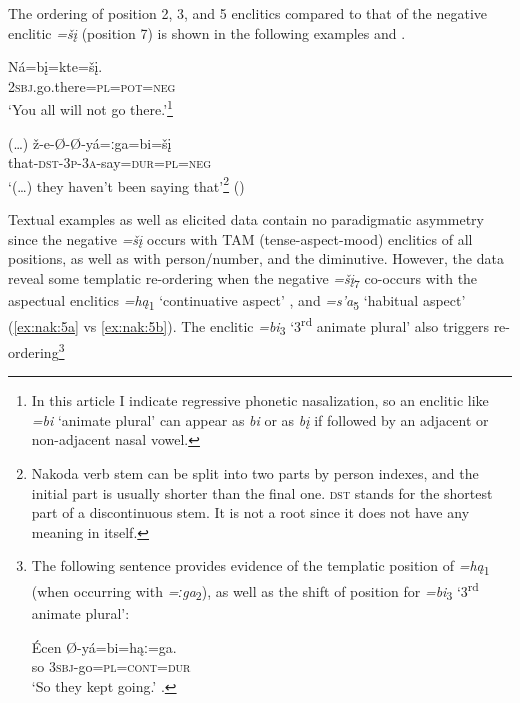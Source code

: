 \documentclass[output=paper,colorlinks,citecolor=brown]{langscibook}
\begin{document}
\newpage%
The ordering of position 2, 3, and 5 enclitics compared to that of the negative enclitic \textit{=šį} (position 7) is shown in the following examples  and .

\ea\label{ex:nak:2} 
    \gll Ná=bį=kte=šį. \\
        2\textsc{sbj}.go.there=\textsc{pl=pot=neg} \\ 
    \glt ‘You all will not go there.’\footnote{In this article I indicate regressive phonetic nasalization, so an enclitic like \textit{=bi} ‘animate plural’ can appear as \textit{bi} or as \textit{bį} if followed by an adjacent or non-adjacent nasal vowel.}
\z 

\ea\label{ex:nak:3}
    \gll (…) ž-e-Ø-Ø-yá=ːga=bi=šį \\
        {} that-\textsc{dst-3p-3a}-say=\textsc{dur=pl=neg} \\
    \glt ‘(…) they haven’t been saying that’\footnote{Nakoda verb stem can be split into two parts by person indexes, and the initial part is usually shorter than the final one. \textsc{dst} stands for the shortest part of a discontinuous stem. It is not a root since it does not have any meaning in itself.} (\citealt[33]{ParksDeMallie2012b})
\z 

Textual examples as well as elicited data contain no paradigmatic asymmetry since the negative \textit{=šį} occurs with TAM (tense-aspect-mood) enclitics of all positions, as well as with person/number, and the diminutive. However, the data reveal some templatic re-ordering when the negative \textit{=šį}\textsubscript{7} co-occurs with the aspectual enclitics \textit{=hą}\textsubscript{1} ‘continuative aspect’ , and \textit{=s’a}\textsubscript{5} ‘habitual aspect’ (\ref{ex:nak:5a} vs \ref{ex:nak:5b}). The enclitic \textit{=bi}\textsubscript{3} ‘\textsc{3}\textsuperscript{rd} animate plural’ also triggers re-ordering\footnote{The following sentence provides evidence of the templatic position of \textit{=hą}\textsubscript{1} (when occurring with \textit{=ːga}\textsubscript{2}), as well as the shift of position for \textit{=bi}\textsubscript{3} ‘3\textsuperscript{rd} animate plural’:

\ea\label{ex:nak:fn}
    \gll \'{E}cen   Ø-yá=bi=hąː=ga. \\ 
         so \textsc{3sbj}-go=\textsc{pl=cont=dur} \\
    \glt ‘So they kept going.’ \citep[315]{Cumberland2005}.
\z 
}
\end{document}
